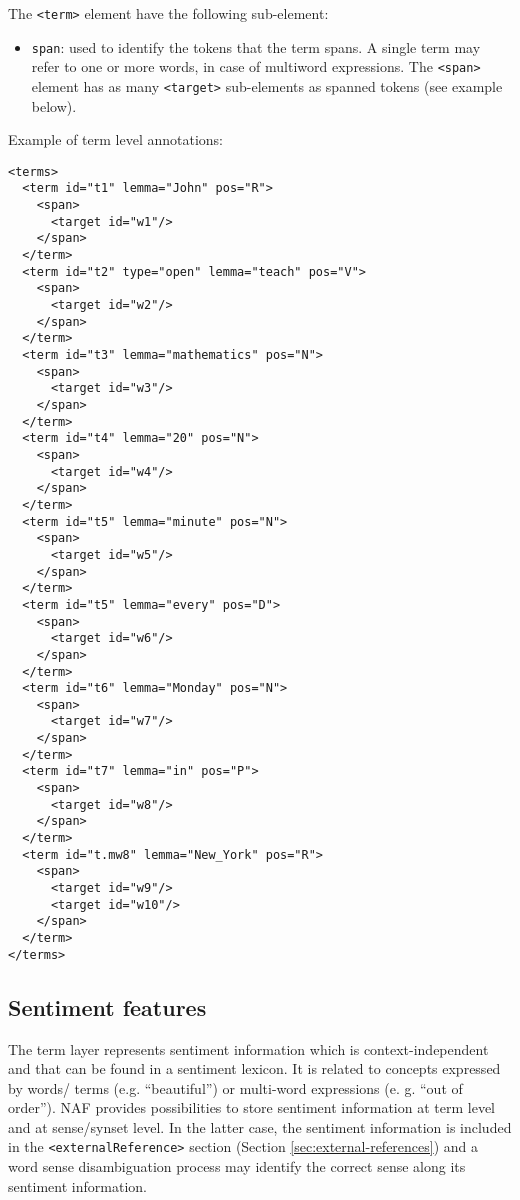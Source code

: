 The \texttt{<term>} element have the following sub-element:
\begin{itemize}
\item \texttt{span}: used to identify the tokens that the term spans. A
  single term may refer to one or more words, in case of multiword
  expressions. The \texttt{<span>} element has as many \texttt{<target>}
  sub-elements as spanned tokens (see example below).
\end{itemize}

Example of term level annotations:
\begin{Verbatim}[fontsize=\small]
<terms>
  <term id="t1" lemma="John" pos="R">
    <span>
      <target id="w1"/>
    </span>
  </term>
  <term id="t2" type="open" lemma="teach" pos="V">
    <span>
      <target id="w2"/>
    </span>
  </term>
  <term id="t3" lemma="mathematics" pos="N">
    <span>
      <target id="w3"/>
    </span>
  </term>
  <term id="t4" lemma="20" pos="N">
    <span>
      <target id="w4"/>
    </span>
  </term>
  <term id="t5" lemma="minute" pos="N">
    <span>
      <target id="w5"/>
    </span>
  </term>
  <term id="t5" lemma="every" pos="D">
    <span>
      <target id="w6"/>
    </span>
  </term>
  <term id="t6" lemma="Monday" pos="N">
    <span>
      <target id="w7"/>
    </span>
  </term>
  <term id="t7" lemma="in" pos="P">
    <span>
      <target id="w8"/>
    </span>
  </term>
  <term id="t.mw8" lemma="New_York" pos="R">
    <span>
      <target id="w9"/>
      <target id="w10"/>
    </span>
  </term>
</terms>
\end{Verbatim}


\subsection{Sentiment features}
\label{sec:sentiment-features}

The term layer represents sentiment information which is context-independent
and that can be found in a sentiment lexicon. It is related to concepts
expressed by words/ terms (e.g. ``beautiful'') or multi-word expressions
(e. g. ``out of order''). NAF provides possibilities to store sentiment
information at term level and at sense/synset level. In the latter case, the
sentiment information is included in the \texttt{<externalReference>}
section (Section \ref{sec:external-references}) and a word sense
disambiguation process may identify the correct sense along its sentiment
information. \\


